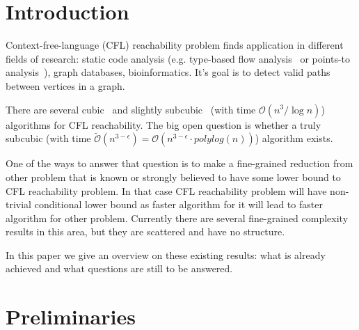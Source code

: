 \documentclass[acmsmall,nonacm]{acmart}
\begin{document}
	
	
	
	\maketitle
	
	\section{Introduction}

	Context-free-language (CFL) reachability problem finds application in different fields of research: static code analysis (e.g. type-based flow analysis~\cite{10.1145/373243.360208} or points-to analysis~\cite{10.1145/1103845.1094817, 10.1145/1133255.1134027}), graph databases, bioinformatics. It's goal is to detect valid paths between vertices in a graph. 

	There are several cubic~\cite{10.1145/298514.298576, 10.1145/199448.199462} and slightly subcubic~\cite{10.1145/1328438.1328460} (with time $\mathcal{O}(n^{3} / \log n)$) algorithms for CFL reachability. The big open question is whether a truly subcubic (with time $\tilde{\mathcal{O}}(n^{3 - \epsilon}) = \mathcal{O}(n^{3 - \epsilon} \cdot polylog(n))$) algorithm exists. 

	One of the ways to answer that question is to make a fine-grained reduction from other problem that is known or strongly believed to have some lower bound to CFL reachability problem. In that case CFL reachability problem will have non-trivial conditional lower bound as faster algorithm for it will lead to faster algorithm for other problem. Currently there are several fine-grained complexity results in this area, but they are scattered and have no structure.

	In this paper we give an overview on these existing results: what is already achieved and what questions are still to be answered.

	\section{Preliminaries}
\end{document}
